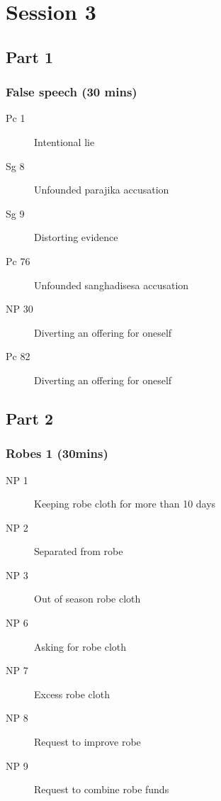 \documentclass[11pt,oneside]{memoir}
\begin{document}
\chapter{Session 3}

\begin{multicols}{2}

\section{Part 1}

\subsection{False speech (30 mins)}

\begin{description}
\item[Pc 1] Intentional lie
\item[Sg 8] Unfounded parajika accusation
\item[Sg 9] Distorting evidence
\item[Pc 76] Unfounded sanghadisesa accusation
\item[NP 30] Diverting an offering for oneself
\item[Pc 82] Diverting an offering for oneself
\end{description}

\columnbreak

\section{Part 2}

\subsection{Robes 1 (30mins)}

\begin{description}
\item[NP 1] Keeping robe cloth for more than 10 days
\item[NP 2] Separated from robe
\item[NP 3] Out of season robe cloth
\item[NP 6] Asking for robe cloth
\item[NP 7] Excess robe cloth
\item[NP 8] Request to improve robe
\item[NP 9] Request to combine robe funds
\end{description}

\end{multicols}
\end{document}
